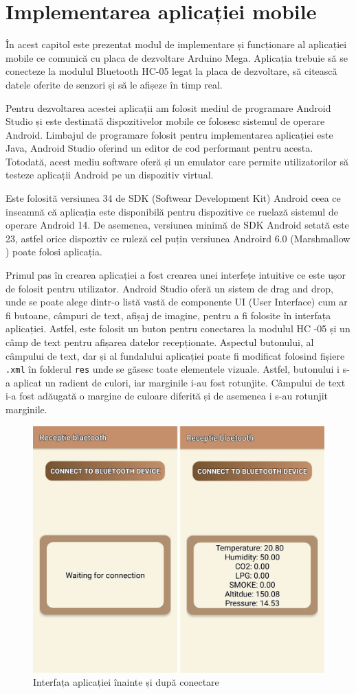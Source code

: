 \chapter{Implementarea aplicației mobile}
\thispagestyle{pagestyle}

În acest capitol este prezentat modul de implementare și funcționare al aplicației mobile ce comunică cu placa de dezvoltare Arduino Mega. Aplicația trebuie să se conecteze la modulul Bluetooth HC-05 legat la placa de dezvoltare, să citească datele oferite de senzori și să le afișeze în timp real.

Pentru dezvoltarea acestei aplicații am folosit mediul de programare Android Studio și este destinată dispozitivelor mobile ce folosesc sistemul de operare Android. Limbajul de programare folosit pentru implementarea aplicației este Java, Android Studio oferind un editor de cod performant pentru acesta. Totodată, acest mediu software oferă și un emulator care permite utilizatorilor să testeze aplicații Android pe un dispozitiv virtual.

Este folosită versiunea 34 de SDK (Softwear Development Kit) Android ceea ce inseamnă că aplicația este disponibilă pentru dispozitive ce ruelază sistemul de operare Android 14. De asemenea, versiunea minimă de SDK Android setată este 23, astfel orice dispoztiv ce ruleză cel puțin versiunea Androird 6.0 (Marshmallow \cite{marhsmallow}) poate folosi aplicația.

Primul pas în crearea aplicației a fost crearea unei interfețe intuitive ce este ușor de folosit pentru utilizator. Android Studio oferă un sistem de drag and drop, unde se poate alege dintr-o listă vastă de componente UI (User Interface) cum ar fi butoane, câmpuri de text, afișaj de imagine, pentru a fi folosite în interfața aplicației. Astfel, este folosit un buton pentru conectarea la modulul HC -05 și un câmp de text pentru afișarea datelor recepționate. Aspectul butonului, al câmpului de text, dar și al fundalului aplicației poate fi modificat folosind fișiere \texttt{.xml} în folderul \texttt{res} unde se găsesc toate elementele vizuale. Astfel, butonului i s-a aplicat un radient de culori, iar marginile i-au fost rotunjite. Câmpului de text i-a fost adăugată o margine de culoare diferită și de asemenea i s-au rotunjit marginile.

\begin{figure}[H]
\includegraphics[width=0.6\linewidth]{bachelors_ro/images/bt_app_combined_separted.png}
\caption{Interfața aplicației înainte și după conectare}
\label{fig:bt_app_combined_separted}
\end{figure}

